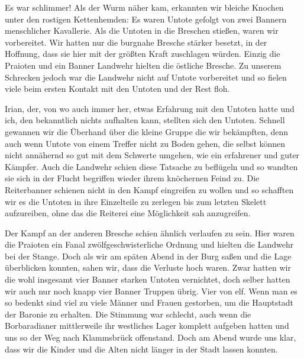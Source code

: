 Es war schlimmer! Als der Wurm näher kam, erkannten wir bleiche Knochen unter den rostigen Kettenhemden: Es waren Untote gefolgt von zwei Bannern menschlicher Kavallerie. Als die Untoten in die Breschen stießen, waren wir vorbereitet. Wir hatten nur die burgnahe Bresche stärker besetzt, in der Hoffnung, dass sie hier mit der größten Kraft zuschlagen würden. Einzig die Praioten und ein Banner Landwehr hielten die östliche Bresche. Zu unserem Schrecken jedoch war die Landwehr nicht auf Untote vorbereitet und so fielen viele beim ersten Kontakt mit den Untoten und der Rest floh. 

Irian, der, von wo auch immer her, etwas Erfahrung mit den Untoten hatte und ich, den bekanntlich nichts aufhalten kann, stellten sich den Untoten. Schnell gewannen wir die Überhand über die kleine Gruppe die wir bekämpften, denn auch wenn Untote von einem Treffer nicht zu Boden gehen, die selbst können nicht annähernd so gut mit dem Schwerte umgehen, wie ein erfahrener und guter Kämpfer. Auch die Landwehr schien diese Tatsache zu beflügeln und so wandten sie sich in der Flucht begriffen wieder ihrem knöchernen Feind zu. Die Reiterbanner schienen nicht in den Kampf eingreifen zu wollen und so schafften wir es die Untoten in ihre Einzelteile zu zerlegen bis zum letzten Skelett aufzureiben, ohne das die Reiterei eine Möglichkeit sah anzugreifen. 

Der Kampf an der anderen Bresche schien ähnlich verlaufen zu sein. Hier waren die Praioten ein Fanal zwölfgeschwisterliche Ordnung und hielten die Landwehr bei der Stange. Doch als wir am späten Abend in der Burg saßen und die Lage überblicken konnten, sahen wir, dass die Verluste hoch waren. Zwar hatten wir die wohl insgesamt vier Banner starken Untoten vernichtet, doch selber hatten wir auch nur noch knapp vier Banner Truppen übrig. Vier von elf. Wenn man es so bedenkt sind viel zu viele Männer und Frauen gestorben, um die Hauptstadt der Baronie zu erhalten. Die Stimmung war schlecht, auch wenn die Borbaradianer mittlerweile ihr westliches Lager komplett aufgeben hatten und uns so der Weg nach Klammsbrück offenstand. Doch am Abend wurde uns klar, dass wir die Kinder und die Alten nicht länger in der Stadt lassen konnten. 

